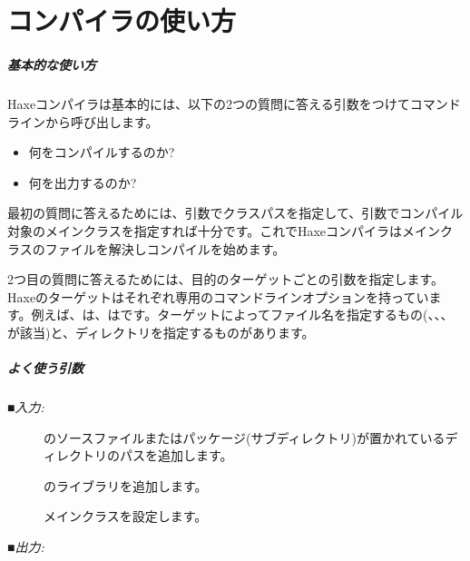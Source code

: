\chapter{コンパイラの使い方}
\label{compiler-usage}

\paragraph{基本的な使い方}

Haxeコンパイラは基本的には、以下の2つの質問に答える引数をつけてコマンドラインから呼び出します。

\begin{itemize}
	\item 何をコンパイルするのか?
	\item 何を出力するのか?
\end{itemize}

最初の質問に答えるためには、引数でクラスパスを指定して、引数でコンパイル対象のメインクラスを指定すれば十分です。これでHaxeコンパイラはメインクラスのファイルを解決しコンパイルを始めます。

2つ目の質問に答えるためには、目的のターゲットごとの引数を指定します。Haxeのターゲットはそれぞれ専用のコマンドラインオプションを持っています。例えば、は、はです。ターゲットによってファイル名を指定するもの(、、、が該当)と、ディレクトリを指定するものがあります。

\paragraph{よく使う引数}

■\emph{入力:}

\begin{description}
	\item[] のソースファイルまたはパッケージ(サブディレクトリ)が置かれているディレクトリのパスを追加します。
	\item[] のライブラリを追加します。
	\item[] メインクラスを設定します。
\end{description}

■\emph{出力:}

